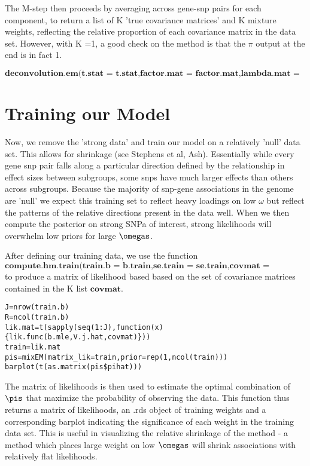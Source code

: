 \documentclass[10pt]{article}
\begin{document}
The M-step then proceeds by averaging across gene-snp pairs for each component, to return a list of K 'true covariance matrices' and K mixture weights, reflecting the relative proportion of each covariance matrix in the data set. However, with K =1, a good check on the method is that the $\pi$ output at the end is in fact 1.

$\textbf{deconvolution.em(t.stat = t.stat,factor.mat = factor.mat,lambda.mat = lambda.mat,K = 1,P=2,permsnp = 1000)}$






\section{Training our Model}

Now, we remove the 'strong data' and train our model on a relatively 'null' data set. This allows for shrinkage (see Stephens et al, Ash). Essentially while every gene snp pair falls along a particular direction defined by the relationship in effect sizes between subgroups, some snps have much larger effects than others across subgroups. Because the majority of snp-gene associations in the genome are 'null' we expect this training set to reflect heavy loadings on low $\omega$ but reflect the patterns of the relative directions present in the data well. When we then compute the posterior on strong SNPa of interest, strong likelihoods will overwhelm low priors for large $\omegas$.


After defining our training data, we use the function $\textbf{compute.hm.train(train.b = b.train,se.train = se.train,covmat = covmat,A="Simulations")}$ to produce a matrix  of likelihood based based on the set of covariance matrices contained in the K list $\textbf{covmat}$. 

\begin{verbatim}
J=nrow(train.b)
R=ncol(train.b)
lik.mat=t(sapply(seq(1:J),function(x){lik.func(b.mle,V.j.hat,covmat)}))
train=lik.mat
pis=mixEM(matrix_lik=train,prior=rep(1,ncol(train)))
barplot(t(as.matrix(pis$pihat)))
\end{verbatim}

The matrix of likelihoods is then used to estimate the optimal combination of $\pis$ that maximize the probability of observing the data. This function thus returns a matrix of likelihoods, an .rds object of training weights and a corresponding barplot indicating the significance of each weight in the training data set. This is useful in visualizing the relative shrinkage of the method - a method which places large weight on low $\omegas$ will shrink associations with relatively flat likelihoods.
\end{document}
